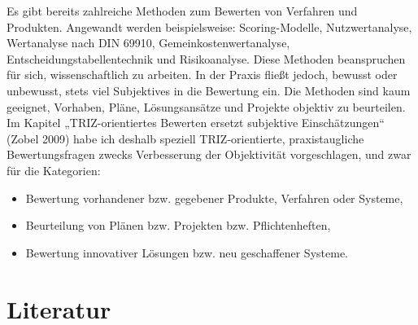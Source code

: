 \documentclass[12pt,a4paper]{article}
\begin{document}
Es gibt bereits zahlreiche Methoden zum Bewerten von Verfahren und Produkten.
Angewandt werden beispielsweise: Scoring-Modelle, Nutzwertanalyse, Wertanalyse
nach DIN 69910, Gemeinkostenwertanalyse, Entscheidungstabellentechnik und
Risikoanalyse. Diese Methoden beanspruchen für sich, wissenschaftlich zu
arbeiten. In der Praxis fließt jedoch, bewusst oder unbewusst, stets viel
Subjektives in die Bewertung ein. Die Methoden sind kaum geeignet, Vorhaben,
Pläne, Lösungsansätze und Projekte objektiv zu beurteilen. Im Kapitel
„TRIZ-orientiertes Bewerten ersetzt subjektive Einschätzungen“ (Zobel 2009)
habe ich deshalb speziell TRIZ-orientierte, praxistaugliche Bewertungsfragen
zwecks Verbesserung der Objektivität vorgeschlagen, und zwar für die
Kategorien:
\begin{itemize}
\item Bewertung vorhandener bzw. gegebener Produkte, Verfahren oder Systeme,
\item Beurteilung von Plänen bzw. Projekten bzw. Pflichtenheften,
\item Bewertung innovativer Lösungen bzw. neu geschaffener Systeme.
\end{itemize}
\clearpage
\section*{Literatur}
\end{document}
